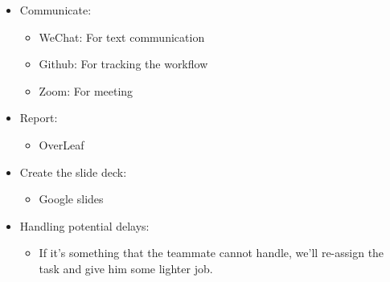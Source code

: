 \begin{itemize}
    \item Communicate:
    \begin{itemize}
        \item WeChat: For text communication
        \item Github: For tracking the workflow
        \item Zoom: For meeting
    \end{itemize}
    \item Report:
    \begin{itemize}
        \item OverLeaf
    \end{itemize}
    \item Create the slide deck:
    \begin{itemize}
        \item Google slides
    \end{itemize}
    \item Handling potential delays:
    \begin{itemize}
        \item If it's something that the teammate cannot handle, we'll re-assign the task and give him some lighter job.
    \end{itemize}
\end{itemize}
